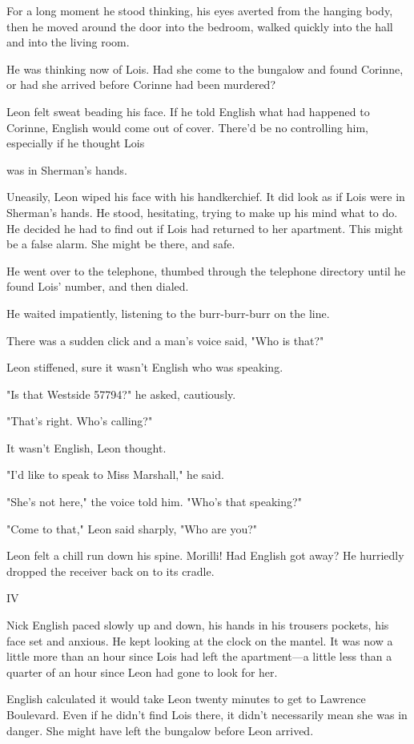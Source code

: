 \documentclass{novel}
\begin{document}
For a long moment he stood thinking, his eyes averted from the hanging body, then he moved around the door into the bedroom, walked quickly into the hall and into the living room.

He was thinking now of Lois. Had she come to the bungalow and found Corinne, or had she arrived before Corinne had been murdered?

Leon felt sweat beading his face. If he told English what had happened to Corinne, English would come out of cover. There'd be no controlling him, especially if he thought Lois

was in Sherman's hands.

Uneasily, Leon wiped his face with his handkerchief. It did look as if Lois were in Sherman's hands. He stood, hesitating, trying to make up his mind what to do. He decided he had to find out if Lois had returned to her apartment. This might be a false alarm. She might be there, and safe.

He went over to the telephone, thumbed through the telephone directory until he found Lois' number, and then dialed.

He waited impatiently, listening to the burr-burr-burr on the line.

There was a sudden click and a man's voice said, "Who is that?"

Leon stiffened, sure it wasn't English who was speaking.

"Is that Westside 57794?" he asked, cautiously.

"That's right. Who's calling?"

It wasn't English, Leon thought.

"I'd like to speak to Miss Marshall," he said.

"She's not here," the voice told him. "Who's that speaking?"

"Come to that," Leon said sharply, "Who are you?"

Leon felt a chill run down his spine. Morilli! Had English got away? He hurriedly dropped the receiver back on to its cradle.



IV

Nick English paced slowly up and down, his hands in his trousers pockets, his face set and anxious. He kept looking at the clock on the mantel. It was now a little more than an hour since Lois had left the apartment—a little less than a quarter of an hour since Leon had gone to look for her.

English calculated it would take Leon twenty minutes to get to Lawrence Boulevard. Even if he didn't find Lois there, it didn't necessarily mean she was in danger. She might have left the bungalow before Leon arrived.
\end{document}
